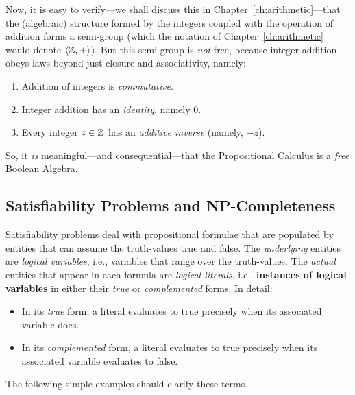 Now, it is easy to verify---we shall discuss this in Chapter~\ref{ch:arithmetic}---that the (algebraic) structure formed by the integers coupled with the operation of addition forms a semi-group (which the notation of Chapter~\ref{ch:arithmetic} would denote $\langle \mathbb{Z}, + \rangle$).  But this semi-group is {\em not} free, because integer addition obeys laws beyond just closure and associativity, namely:
\begin{enumerate}
\item
Addition of integers is {\em commutative}.
\medskip\item
Integer addition has an {\em identity}, namely $0$.
\medskip\item
Every integer $z \in \mathbb{Z}$ has an {\it additive inverse} (namely, $-z$).
\end{enumerate}

So, it {\em is} meaningful---and consequential---that the Propositional Calculus is a {\em free} Boolean Algebra.


\subsection{Satisfiability Problems and {\sf NP}-Completeness}
\label{sec:Satisfiability}


Satisfiability problems deal with propositional formulae that are populated by entities that can assume the truth-values {\sc true} and {\sc false}.  The {\em underlying} entities are {\it logical variables}, i.e., variables that range over the truth-values.  The {\em actual} entities that appear in each formula are {\it logical literals}, i.e., {\bf instances of logical variables} in either their {\em true} or {\em complemented} forms.  In detail:
\begin{itemize}
\item
In its {\em true} form, a literal evaluates to {\sc true} precisely when its associated variable does.
\medskip\item
In its {\em complemented} form, a literal evaluates to {\sc true} precisely when its associated variable evaluates to {\sc false}.
\end{itemize}
The following simple examples should clarify these terms.

